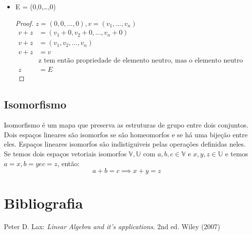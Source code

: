 \documentclass{article}
\theoremstyle{plain}
\theoremstyle{remark}
\numberwithin{equation}{section}
\numberwithin{thm}{section}
\numberwithin{defn}{section}
\numberwithin{lemma}{section}
\numberwithin{axm}{section}
\begin{document}
\begin{itemize}
\begin{proof}
\begin{align*}
			v + -1v &= E\\
			v - v + -1v &= E -v\\
			E + -1v &= -v\\
			-1v &= -v			
		\end{align*}
	\end{proof}
		\item E = (0,0,\dots ,0)
		\begin{proof}
			\( z = (0,0,\dots ,0), v = (v_1, \dots , v_n) \)
			\begin{align*}
				v + z &= (v_1 + 0, v_2 + 0, \dots , v_n + 0)\\
				v + z &= (v_1, v_2, \dots, v_n)\\
				v + z &= v\\
				&\text{z tem então propriedade de elemento neutro, mas o elemento neutro é único, logo}\\
				z &= E 
			\end{align*}
		\end{proof}
\end{itemize}

\subsection{Isomorfismo}
Isomorfismo é um mapa que preserva as estruturas de grupo entre dois conjuntos.\\
Dois espaços lineares são isomorfos se são homeomorfos e se há uma bijeção entre eles. Espaços lineares isomorfos são indistiguiveis pelas operações definidas neles.\\
Se temos dois espaços vetoriais isomorfos \(\mathbb{V}, \mathbb{U}\) com \(a,b,c \in \mathbb{V}\) e \( x,y,z \in \mathbb{U}\) e temos \(a = x, b = y e c = z\), então:
\[ a + b = c \implies x + y = z\]


\section*{Bibliografia}
\begin{thebibliography}{1}

Peter D. Lax: \textit{Linear Algebra and it's applications}. 2nd ed. Wiley (2007)
\end{thebibliography}
\end{document}
